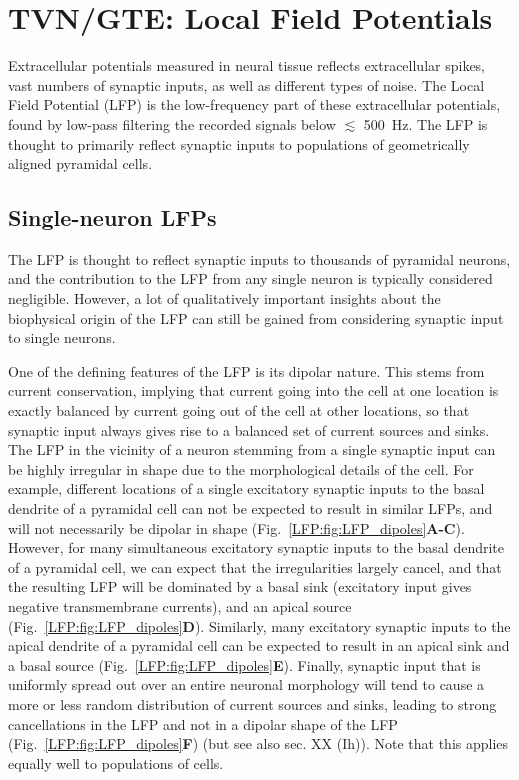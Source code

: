 \chapter{TVN/GTE: Local Field Potentials}
\label{sec:LFP}

Extracellular potentials measured in neural tissue reflects extracellular spikes, vast numbers of synaptic inputs, as well as different types of noise. The Local Field Potential (LFP) is the low-frequency part of these extracellular potentials, found by low-pass filtering the recorded signals below $\lesssim$ 500~Hz. The LFP is thought to primarily reflect synaptic inputs to populations of geometrically aligned pyramidal cells.

\section{Single-neuron LFPs}
The LFP is thought to reflect synaptic inputs to thousands of pyramidal neurons, and the contribution to the LFP from any single neuron is typically considered negligible. However, a lot of qualitatively important insights about the biophysical origin of the LFP can still be gained from considering synaptic input to single neurons. 

One of the defining features of the LFP is its dipolar nature. This stems from current conservation, implying that current going into the cell at one location is exactly balanced by current going out of the cell at other locations, so that synaptic input always gives rise to a balanced set of current sources and sinks. The LFP in the vicinity of a neuron stemming from a single synaptic input can be highly irregular in shape due to the morphological details of the cell. For example, different locations of a single excitatory synaptic inputs to the basal dendrite of a pyramidal cell can not be expected to result in similar LFPs, and will not necessarily be dipolar in shape (Fig.~\ref{LFP:fig:LFP_dipoles}{\bf A-C}). However, for many simultaneous excitatory synaptic inputs to the basal dendrite of a pyramidal cell, we can expect that the irregularities largely cancel, and that the resulting LFP will be dominated by a basal sink (excitatory input gives negative transmembrane currents), and an apical source (Fig.~\ref{LFP:fig:LFP_dipoles}{\bf D}). Similarly, many excitatory synaptic inputs to the apical dendrite of a pyramidal cell can be expected to result in an apical sink and a basal source (Fig.~\ref{LFP:fig:LFP_dipoles}{\bf E}). Finally, synaptic input that is uniformly spread out over an entire neuronal morphology will tend to cause a more or less random distribution of current sources and sinks, leading to strong cancellations in the LFP and not in a dipolar shape of the LFP (Fig.~\ref{LFP:fig:LFP_dipoles}{\bf F}) (but see also sec. XX (Ih)). Note that this applies equally well to populations of cells.

